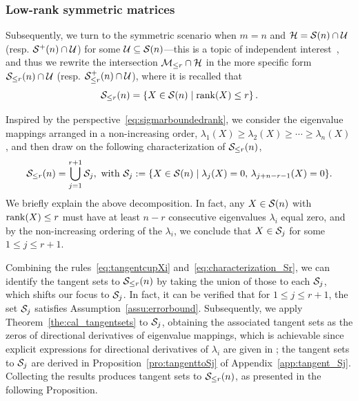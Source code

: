 \subsubsection{Low-rank symmetric matrices}\label{sec:lowrank_sym}
Subsequently, we turn to the symmetric scenario when $m=n$ and $\mathcal{H}=\mathcal{S}(n)\cap\mathcal{U}$ (resp. $\mathcal{S}^+(n)\cap\mathcal{U}$) for some $\mathcal{U}\subseteq\mathcal{S}(n)$---this is a topic of independent interest~\cite{pataki1998lowranksolution,li2020jotaspectral}, and thus we rewrite the intersection $\mathcal{M}_{\le r}\cap\mathcal{H}$ in the more specific form $\mathcal{S}_{\le r}(n)\cap\mathcal{U}$ (resp. $\mathcal{S}^+_{\le r}(n)\cap\mathcal{U}$), where it is recalled that
\begin{equation}\label{eq:define_Srn}
    \mathcal{S}_{\le r}(n) = \left\{ {X\in\mathcal{S}(n)\mid \operatorname{rank}(X)\le r} \right\}.
\end{equation}

Inspired by the perspective~\eqref{eq:sigmarboundedrank}, we consider the eigenvalue mappings arranged in a non-increasing order, $\lambda_1(X)\ge\lambda_2(X)\ge\cdots\ge\lambda_n(X)$, and then draw on the following characterization of $\mathcal{S}_{\le r}(n)$, 
\begin{equation}\label{eq:characterization_Sr}
    \sym_{\le r}(n)=\bigcup_{j=1}^{r+1} \sanifold_j,\ \text{with}\ \sanifold_j:=\{X\in\sym(n)\mid\lambda_{j}(X)=0,\,\lambda_{j+n-r-1}(X)=0\}.
\end{equation}
We briefly explain the above decomposition. In fact, any $X\in\mathcal{S}(n)$ with $\operatorname{rank}(X)\le r$ must have at least $n-r$ consecutive eigenvalues $\lambda_i$ equal zero, and by the non-increasing ordering of the $\lambda_i$, we conclude that $X\in\mathcal{S}_j$ for some $1\le j \le r+1$.

Combining the rules~\eqref{eq:tangentcupXi} and~\eqref{eq:characterization_Sr}, we can identify the tangent sets to $\mathcal{S}_{\le r}(n)$ by taking the union of those to each $\mathcal{S}_j$, which shifts our focus to $\mathcal{S}_j$. In fact, it can be verified that for $1\le j\le r+1$, the set $\mathcal{S}_j$ satisfies Assumption~\ref{assu:errorbound}. Subsequently, we apply Theorem~\ref{the:cal_tangentsets} to $\mathcal{S}_j$, obtaining the associated tangent sets as the zeros of directional derivatives of eigenvalue mappings, which is achievable since explicit expressions for directional derivatives of $\lambda_i$ are given in \cite{torki2001secondtoeigen,zhang2013secondordersingular}; the tangent sets to $\mathcal{S}_j$ are derived in Proposition~\ref{pro:tangenttoSj} of Appendix~\ref{app:tangent_Sj}. Collecting the results produces tangent sets to $\mathcal{S}_{\le r}(n)$, as presented in the following Proposition.



